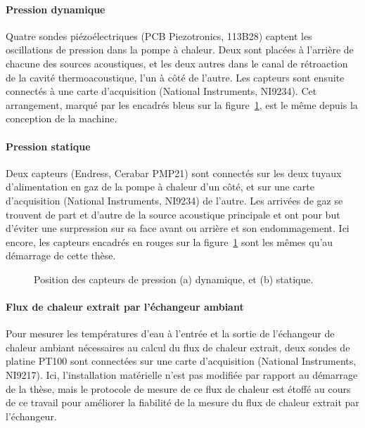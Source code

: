 \paragraph{Pression dynamique} Quatre sondes piézoélectriques (PCB Piezotronics, 113B28) captent les oscillations de pression dans la pompe à chaleur. Deux sont placées à l'arrière de chacune des sources acoustiques, et les deux autres dans le canal de rétroaction de la cavité thermoacoustique, l'un à côté de l'autre. Les capteurs sont ensuite connectés à une carte d'acquisition (National Instruments, NI9234). Cet arrangement, marqué par les encadrés bleus sur la figure~\ref{fig:PhotosPressionStatDyn}, est le même depuis la conception de la machine.

\paragraph{Pression statique} Deux capteurs (Endress, Cerabar PMP21) sont connectés sur les deux tuyaux d'alimentation en gaz de la pompe  à chaleur d'un côté, et sur une carte d'acquisition (National Instruments, NI9234) de l'autre. Les arrivées de gaz se trouvent de part et d'autre de la source acoustique principale et ont pour but d'éviter une surpression sur sa face avant ou arrière et son endommagement. Ici encore, les capteurs encadrés en rouges sur la figure~\ref{fig:PhotosPressionStatDyn} sont les mêmes qu'au démarrage de cette thèse.

\begin{figure}[!ht]
	\centering
	
	\caption{Position des capteurs de pression (a) dynamique, et (b) statique.}
	\label{fig:PhotosPressionStatDyn}
\end{figure}

\paragraph{Flux de chaleur extrait par l'échangeur ambiant} Pour mesurer les températures d'eau à l'entrée et la sortie de l'échangeur de chaleur ambiant nécessaires au calcul du flux de chaleur extrait, deux sondes de platine PT100 sont connectées sur une carte d'acquisition (National Instruments, NI9217). Ici, l'installation matérielle n'est pas modifiée par rapport au démarrage de la thèse, mais le protocole de mesure de ce flux de chaleur est étoffé au cours de ce travail pour améliorer la fiabilité de la mesure du flux de chaleur extrait par l'échangeur.

